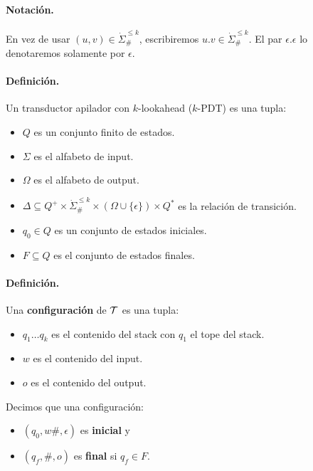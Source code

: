 \paragraph{Notación.} En vez de usar $(u,v) \in \dot{\Sigma}_{\#}^{\le k}$, escribiremos $u.v \in \dot{\Sigma}_{\#}^{\le k}$. El par $\epsilon.\epsilon$ lo denotaremos solamente por $\epsilon$.

\paragraph{Definición.} Un transductor apilador con $k$-lookahead ($k$-PDT) es una tupla:

\begin{itemize}
    \item $Q$ es un conjunto finito de estados.
    \item $\Sigma$ es el alfabeto de input.
    \item $\Omega$ es el alfabeto de output.
    \item $\Delta \subseteq Q^{+} \times \dot{\Sigma}_{\#}^{\leq k} \times(\Omega \cup\{\epsilon\}) \times Q^*$ es la relación de transición.
    \item $q_0 \in Q$ es un conjunto de estados iniciales.
    \item $F \subseteq Q$ es el conjunto de estados finales.
\end{itemize}

\paragraph{Definición.} Una \textbf{configuración} de $\mathcal{T}$ es una tupla:
\begin{itemize}
    \item $q_1\ldots q_k$ es el contenido del stack con $q_1$ el tope del stack.
    \item $w$ es el contenido del input.
    \item $o$ es el contenido del output.
\end{itemize}
Decimos que una configuración:
\begin{itemize}
    \item $(q_0, w\#, \epsilon)$ es \textbf{inicial} y
    \item $(q_f, \#, o)$ es \textbf{final} si $q_f \in F$.
\end{itemize}


